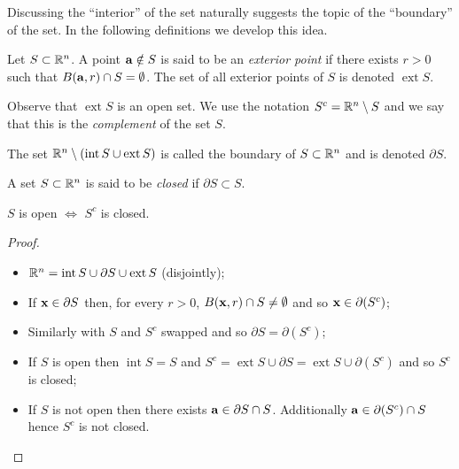 Discussing the ``interior'' of the set naturally suggests the topic of the ``boundary'' of the set.
In the following definitions we develop this idea.


\begin{definition}
    Let \(S\subset \bR^n\).
    A point \(\aa \notin S\) is said to be an \emph{exterior point} if there exists \(r>0\) such that \(B(\aa,r)\cap S = \emptyset\).
    The set of all exterior points of \(S\) is denoted \(\operatorname{ext} S\).
\end{definition}

Observe that \(\operatorname{ext} S\) is an open set.
We use the notation \(S^c = \bR^n \setminus S\) and we say that this is the \emph{complement} of the set \(S\).



\begin{definition}[boundary]
    The set \(\bR^n \setminus (\operatorname{int} S \cup \operatorname{ext} S )\) is called the boundary of \(S \subset \bR^n\) and is denoted \(\partial S\).
\end{definition}


\begin{definition}[closed]
    A set \(S\subset \bR^n\) is said to be \emph{closed} if \(\partial S \subset S\).
\end{definition}

\begin{lemma}
    \(S\) is open \(\Longleftrightarrow \) \(S^c\) is closed.
\end{lemma}
\begin{proof}

    \begin{itemize}
        \item \(\bR^n =  \operatorname{int} S \cup \partial S \cup \operatorname{ext} S\) (disjointly);
        \item If \(\xx \in \partial S\) then, for every \(r>0\), \(B(\xx,r) \cap S \neq \emptyset\) and so \(\xx \in \partial(S^c)\);
        \item Similarly with \(S\) and \(S^c\) swapped and so \(\partial S = \partial(S^c)\);
        \item If \(S\) is open then \(\operatorname{int} S = S\) and \(S^c = \operatorname{ext} S \cup \partial S =  \operatorname{ext} S \cup \partial (S^c)\) and so \(S^c\) is closed;
        \item If \(S\) is not open then there exists \(\aa \in \partial S \cap S\). Additionally  \(\aa \in \partial (S^c) \cap S\) hence \(S^c\) is not closed.
    \end{itemize}
\end{proof}


